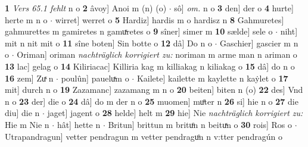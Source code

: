\documentclass[8pt,a4paper,notitlepage]{article}
\begin{document}
\begin{table}[ht]
\begin{minipage}[t]{0.5\linewidth}
\textbf{1} \textit{Vers 65.1 fehlt} n o  \textbf{2} âvoy] Anoi m (n) (o)  $\cdot$ sô] \textit{om.} n o \textbf{3} den] der o \textbf{4} hurte] herte m n o  $\cdot$ wirret] werret o \textbf{5} Hardiz] hardis m o hardisz n \textbf{8} Gahmuretes] gahmurettes m gamiretes n gamuͯretes o \textbf{9} sîner] simer m \textbf{10} sælde] sele o  $\cdot$ niht] mit n nit mit o \textbf{11} sîne boten] Sin botte o \textbf{12} dâ] Do n o  $\cdot$ Gaschier] gascier m n o  $\cdot$ Oriman] oriman \textit{nachträglich korrigiert zu:} noriman m arme man n ariman o \textbf{13} lac] gelag o \textbf{14} Kiliriacac] Killiria kag m killiakag n kiliakag o \textbf{15} dâ] do n o \textbf{16} zem] Zuͯ n  $\cdot$ poulûn] paueluͯm o  $\cdot$ Kailete] kailette m kaylette n kaẏlet o \textbf{17} mit] durch n o \textbf{19} Zazamanc] zazamang m n o \textbf{20} beiten] biten n (o) \textbf{22} des] Vnd n o \textbf{23} der] die o \textbf{24} dâ] do m der n o \textbf{25} muomen] muͦter n \textbf{26} si] hie n o \textbf{27} die diu] die n  $\cdot$ jaget] jagent o \textbf{28} helde] helt m \textbf{29} hie] Nie \textit{nachträglich korrigiert zu:} Hie m Nie n  $\cdot$ hât] hette n  $\cdot$ Britun] brittun m brituͦn n beituͯn o \textbf{30} rois] Ros o  $\cdot$ Utrapandragun] vetter pendragun m vetter pendraguͦn n v:tter pendragún o \newline
\end{minipage}
\end{table}
\newpage
\end{document}
